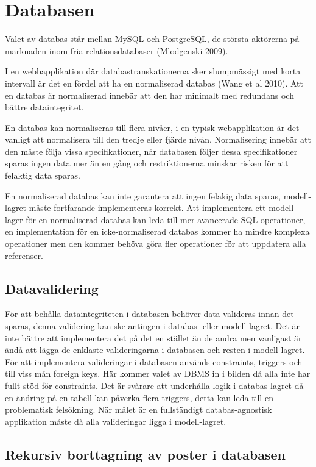 \section{Databasen}\label{sec:databasen}

Valet av databas står mellan MySQL och PostgreSQL, de största aktörerna på marknaden inom fria relationsdatabaser (Mlodgenski 2009).

I en webbapplikation där databastranskationerna sker slumpmässigt med korta intervall är det en fördel att ha en normaliserad databas (Wang et al 2010). Att en databas är normaliserad innebär att den har minimalt med redundans och bättre dataintegritet.

En databas kan normaliseras till flera nivåer, i en typisk webapplikation är det vanligt att normalisera till den tredje eller fjärde nivån. Normalisering innebär att den måste följa vissa specifikationer, när databasen följer dessa specifikationer sparas ingen data mer än en gång och restriktionerna minskar risken för att  felaktig data sparas.

En normaliserad databas kan inte garantera att ingen felakig data sparas, modell-lagret måste fortfarande implementeras korrekt. Att implementera ett modell-lager för en normaliserad databas kan leda till mer avancerade SQL-operationer, en implementation för en icke-normaliserad databas kommer ha mindre komplexa operationer men den kommer behöva göra fler operationer för att uppdatera alla referenser.

\subsection{Datavalidering}
För att behålla dataintegriteten i databasen behöver data valideras innan det sparas, denna validering kan ske antingen i databas- eller modell-lagret.
Det är inte bättre att implementera det på det en stället än de andra men vanligast är ändå att lägga de enklaste valideringarna i databasen och resten i modell-lagret. För att implementera valideringar i databasen används constraints, triggers och till viss mån foreign keys. Här kommer valet av DBMS in i bilden då alla inte har fullt stöd för constraints.
Det är svårare att underhålla logik i databas-lagret då en ändring på en tabell kan påverka flera triggers, detta kan leda till en problematisk felsökning.
När målet är en fullständigt databas-agnostisk applikation måste då alla valideringar ligga i modell-lagret. 

\subsection{Rekursiv borttagning av poster i databasen}

